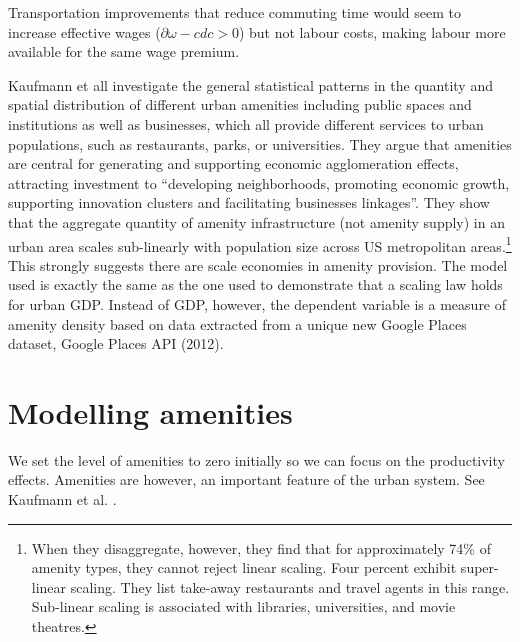Transportation improvements that reduce commuting time would seem to increase effective wages ($\partial{\omega-cd}{c}>0$) but not labour costs, making labour more available for the same wage premium. 

Kaufmann et all investigate the  general statistical patterns in the quantity and spatial distribution of different urban amenities including public spaces and institutions as well as businesses, which all provide different services to urban populations, such as  restaurants, parks, or universities. 
They argue that amenities are  central for generating and supporting economic agglomeration effects, attracting investment to ``developing neighborhoods, promoting economic growth, supporting innovation clusters and facilitating businesses linkages''. 
They show that the aggregate quantity of amenity infrastructure (not amenity supply)  in an urban area  scales sub-linearly  with population size across US metropolitan areas.\footnote{When they disaggregate, however, they find that for approximately 74\% of amenity types, they cannot reject linear scaling. Four percent exhibit super-linear scaling. They list take-away restaurants and travel agents in this range. Sub-linear scaling is associated with libraries, universities, and movie theatres.} This strongly suggests there are scale economies in amenity provision. The model used is exactly the same as the one used to demonstrate that a scaling law holds for  urban GDP. Instead of GDP, however, the dependent variable is a measure of amenity density based on data extracted from a unique new Google Places dataset, Google Places API (2012). 



\section{Modelling amenities}
We set the level of amenities to zero initially so we can focus on the productivity effects.  Amenities are however, an important feature of the urban system. See Kaufmann et al. \cite{kaufmannScalingUrbanAmenities2022}. 

